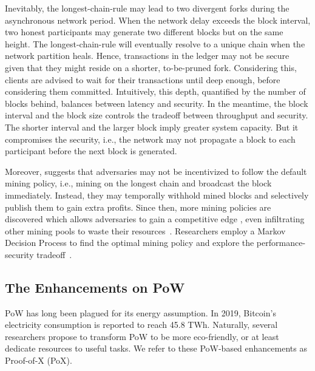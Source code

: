 Inevitably, the longest-chain-rule may lead to two divergent forks during the asynchronous network period. 
When the network delay exceeds the block interval, two honest participants may generate two different blocks but on the same height. 
The longest-chain-rule will eventually resolve to a unique chain when the network partition heals.
Hence, transactions in the ledger may not be secure given that they might reside on a shorter, to-be-pruned fork. 
Considering this, clients are advised to wait for their transactions until deep enough, before considering them committed. 
Intuitively, this depth, quantified by the number of blocks behind, balances between latency and security. 
In the meantime, the block interval and the block size controls the tradeoff between throughput and security. 
The shorter interval and the larger block imply greater system capacity. 
But it compromises the security, i.e., the network may not propagate a block to each participant before the next block is generated. 

Moreover, \cite{eyal2014majority} suggests that adversaries may not be incentivized to follow the default mining policy, i.e., mining on the longest chain and broadcast the block immediately. 
Instead, they may temporally withhold mined blocks and selectively publish them to gain extra profits.
Since then, more mining policies are discovered which allows adversaries to gain a competitive edge \cite{nayak2016stubborn,courtois2014subversive},
even infiltrating other mining pools to waste their resources~\cite{luu2015power,eyal2015miner}. 
Researchers employ a Markov Decision Process to find the optimal mining policy and explore the performance-security tradeoff~\cite{gervais2016security,sapirshtein2016optimal}.

\subsection{The Enhancements on PoW}
PoW has long been plagued for its energy assumption. 
In 2019, Bitcoin's electricity consumption is reported to reach 45.8 TWh. 
Naturally, several researchers propose to transform PoW to be more eco-friendly, 
or at least dedicate resources to useful tasks. 
We refer to these PoW-based enhancements as Proof-of-X (PoX). 

